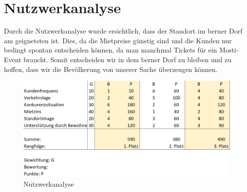 \documentclass[a4paper, titlepage]{article}
\begin{document}
\section{Nutzwerkanalyse}
Durch die Nutzwerkanalyse wurde ersichtlich, dass der Standort im berner Dorf am geignetsten ist. 
Dies, da die Mietpreise günstig sind und die Kunden nur bedingt spontan entscheiden können, da man manchmal Tickets für ein Mosti-Event braucht.
Somit entscheiden wir in dem berner Dorf zu bleiben und zu hoffen, dass wir die Bevölkerung von unserer Sache überzeugen können.

\begin{figure}[h]
  \includegraphics[width=\textwidth]{nutzwerkanalyse}
  \caption{Nutzwerkanalyse}
\end{figure}
\end{document}
